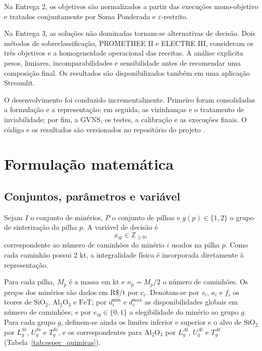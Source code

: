 \documentclass[10pt,twocolumn,a4paper]{article}
\begin{document}
Na Entrega 2, os objetivos são normalizados a partir das execuções mono-objetivo e tratados conjuntamente por Soma Ponderada e $\varepsilon$-restrito.

Na Entrega 3, as soluções não dominadas tornam-se alternativas de decisão. Dois métodos de sobreclassificação, PROMETHEE II e ELECTRE III, consideram os três objetivos e a homogeneidade operacional das receitas. A análise explicita pesos, limiares, incomparabilidades e sensibilidade antes de recomendar uma composição final. Os resultados são disponibilizados também em uma aplicação Streamlit.

O desenvolvimento foi conduzido incrementalmente. Primeiro foram consolidadas a formulação e a representação; em seguida, as vizinhanças e o tratamento de inviabilidade; por fim, a GVNS, os testes, a calibração e as execuções finais. O código e os resultados são versionados no repositório do projeto \cite{repo_projeto}.

\section{Formulação matemática}

\subsection{Conjuntos, parâmetros e variável}

Sejam $I$ o conjunto de minérios, $P$ o conjunto de pilhas e $g(p) \in \{1, 2\}$ o grupo de sinterização da pilha $p$. A variável de decisão é
\begin{equation}
x_{ip} \in \mathbb{Z}_{\ge 0},
\end{equation}
correspondente ao número de caminhões do minério $i$ usados na pilha $p$. Como cada caminhão possui 2 kt, a integralidade física é incorporada diretamente à representação.

Para cada pilha, $M_p$ é a massa em kt e $n_p = M_p/2$ o número de caminhões. Os preços dos minérios são dados em R\$/t por $c_i$. Denotam-se por $s_i$, $a_i$ e $f_i$ os teores de $\text{SiO}_2$, $\text{Al}_2\text{O}_3$ e $\text{FeT}$; por $d_i^{\min}$ e $d_i^{\max}$ as disponibilidades globais em número de caminhões; e por $e_{ig} \in \{0, 1\}$ a elegibilidade do minério ao grupo $g$. Para cada grupo $g$, definem-se ainda os limites inferior e superior e o alvo de $\text{SiO}_2$ por $L_g^{Si}$, $U_g^{Si}$ e $T_g^{Si}$, e os correspondentes para $\text{Al}_2\text{O}_3$ por $L_g^{Al}$, $U_g^{Al}$ e $T_g^{Al}$ (Tabela~\ref{tab:espec_quimicas}).
\end{document}
